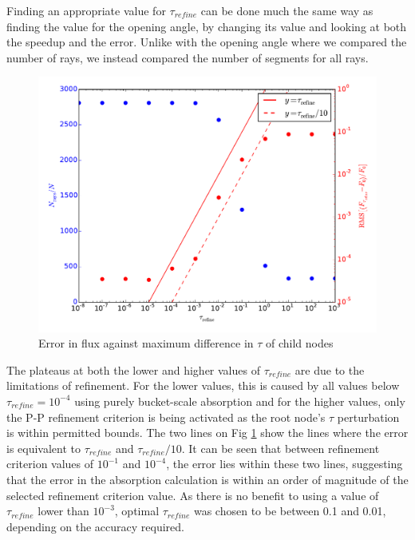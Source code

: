 Finding an appropriate value for $\tau_{refine}$ can be done much the same way as finding the value for the opening angle, by changing its value and looking at both the speedup and the error. Unlike with the opening angle where we compared the number of rays, we instead compared the number of segments for all rays. 
\begin{figure} [H]
    \centering
    \includegraphics[width=\textwidth]{plots/CH4/tau_refine.pdf}
    \caption{Error in flux against maximum difference in $\tau$ of child nodes}
    \label{fig:maxTau}
\end{figure}
 The plateaus at both the lower and higher values of $\tau_{refine}$ are due to the limitations of refinement. For the lower values, this is caused by all values below $\tau_{refine} = 10^{-4}$ using purely bucket-scale absorption and for the higher values, only the P-P refinement criterion is being activated as the root node's $\tau$ perturbation is within permitted bounds. The two lines on Fig \ref{fig:maxTau} show the lines where the error is equivalent to $\tau_{refine}$ and $\tau_{refine}/10$. It can be seen that between refinement criterion values of $10^{-1}$ and $10^{-4}$, the error lies within these two lines, suggesting that the error in the absorption calculation is within an order of magnitude of the selected refinement criterion value. As there is no benefit to using a value of $\tau_{refine}$ lower than $10^{-3}$, optimal $\tau_{refine}$ was chosen to be between 0.1 and 0.01, depending on the accuracy required.

